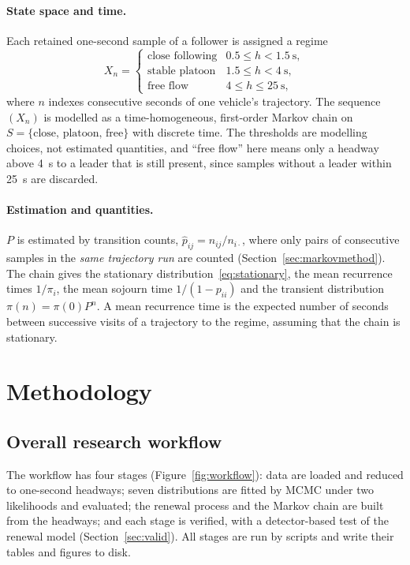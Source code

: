 \documentclass[11pt,a4paper]{article}
\numberwithin{equation}{section}
\begin{document}
\paragraph{State space and time.} Each retained one-second sample of a follower is assigned a regime
\begin{equation}\label{eq:regimes}
X_n=\begin{cases}
\text{close following} & 0.5\le h<1.5\ \text{s},\\
\text{stable platoon} & 1.5\le h<4\ \text{s},\\
\text{free flow} & 4\le h\le25\ \text{s},
\end{cases}
\end{equation}
where $n$ indexes consecutive seconds of one vehicle's trajectory. The sequence $(X_n)$ is modelled as a time-homogeneous,
first-order Markov chain on $S=\{\text{close, platoon, free}\}$ with discrete time. The thresholds are modelling
choices, not estimated quantities, and ``free flow'' here means only a headway above 4~s to a leader that is still present, since samples without a leader within 25~s are discarded.

\paragraph{Estimation and quantities.} $P$ is estimated by transition counts, $\hat p_{ij}=n_{ij}/n_{i\cdot}$, where only
pairs of consecutive samples in the \emph{same trajectory run} are counted (Section~\ref{sec:markovmethod}). The chain gives the
stationary distribution~\eqref{eq:stationary}, the mean recurrence times $1/\pi_i$, the mean sojourn time $1/(1-p_{ii})$ and the transient distribution
$\pi(n)=\pi(0)P^n$. A mean recurrence time is the expected number of seconds between successive visits of a trajectory to the
regime, assuming that the chain is stationary.

\section{Methodology}\label{sec:method}

\subsection{Overall research workflow}
The workflow has four stages (Figure~\ref{fig:workflow}): data are loaded and reduced to one-second headways;
seven distributions are fitted by MCMC under two likelihoods and evaluated; the renewal process and the Markov chain are built from the
headways; and each stage is verified, with a detector-based test of the renewal model (Section~\ref{sec:valid}). All stages are run by scripts and write
their tables and figures to disk.
\end{document}
